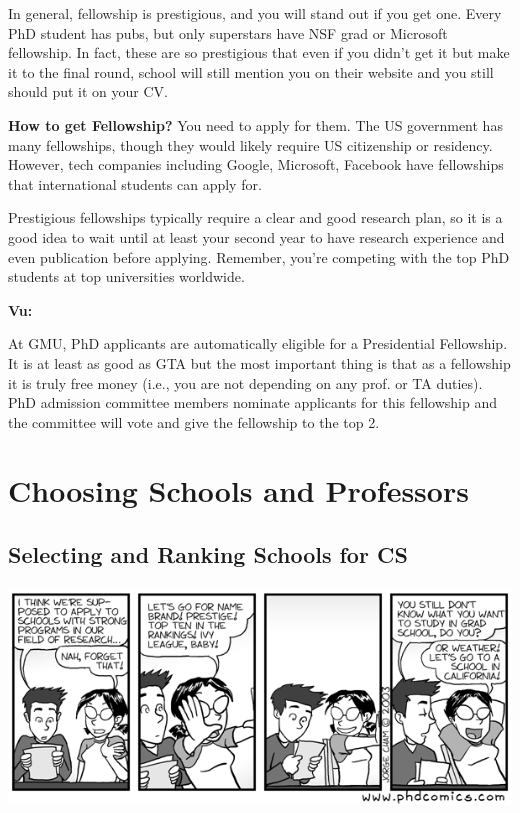 \documentclass[11pt]{article}
\newenvironment{commentbox}[1][]{
\small
    \begin{cbox}
    \textbf{#1} 
 }{
   \end{cbox}
}
\begin{document}
In general, fellowship is prestigious, and you will stand out if you get one.  Every PhD student has pubs, but only superstars have NSF grad or Microsoft fellowship. In fact, these are so prestigious that even if you didn't get it but make it to the final round, school will still mention you on their website and you still should put it on your CV.


\textbf{How to get Fellowship?} You need to apply for them.  The US government has many fellowships, though they would likely require US citizenship or residency.  However, tech companies including Google, Microsoft, Facebook have fellowships that international students can apply for. 

Prestigious fellowships typically require a clear and good research plan, so it is a good idea to wait until at least your second year to have research experience and even publication before applying. Remember, you're competing with the top PhD students at top universities worldwide. 


\begin{commentbox}[Vu:]
At GMU, PhD applicants are automatically eligible for a Presidential Fellowship.  It is at least as good as GTA but the most important thing is that as a fellowship it is truly free money (i.e., you are not depending on any prof. or TA duties).  PhD admission committee members nominate applicants for this fellowship and the committee will vote and give the fellowship to the top 2.
\end{commentbox}

\section{Choosing Schools and Professors}
\subsection{Selecting and Ranking Schools for CS}
   \begin{center}
    \includegraphics[scale=0.5]{c1.png}
   \end{center}
\end{document}

